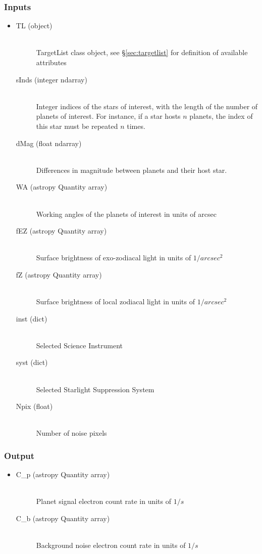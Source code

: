 \documentclass[cleanfoot]{asme2ej}
\begin{document}
\subsubsection*{Inputs}
\begin{itemize}
    \item 
    \begin{description}
        \item[TL (object)] \hfill \\ TargetList class object, see \S\ref{sec:targetlist} for definition of available attributes
        \item[sInds (integer ndarray)] \hfill \\ Integer indices of the stars of interest, with the length of the number of planets of interest. For instance, if a star hosts $ n $ planets, the index of this star must be repeated $ n $ times.
        \item[dMag (float ndarray)] \hfill \\ Differences in magnitude between planets and their host star.
        \item[WA (astropy Quantity array)] \hfill \\ Working angles of the planets of interest in units of arcsec
        \item[fEZ (astropy Quantity array)] \hfill \\ Surface brightness of exo-zodiacal light in units of $ 1/arcsec^2 $
        \item[fZ (astropy Quantity array)] \hfill \\ Surface brightness of local zodiacal light in units of $ 1/arcsec^2 $
        \item[inst (dict)] \hfill \\ Selected Science Instrument
        \item[syst (dict)] \hfill \\ Selected Starlight Suppression System
        \item[Npix (float)] \hfill \\ Number of noise pixels
    \end{description}
\end{itemize}
\subsubsection*{Output}
\begin{itemize}
    \item 
    \begin{description}
        \item[C\_p (astropy Quantity array)] \hfill \\ Planet signal electron count rate in units of $ 1/s $
        \item[C\_b (astropy Quantity array)] \hfill \\ Background noise electron count rate in units of $ 1/s $
    \end{description}
\end{itemize}
\end{document}
